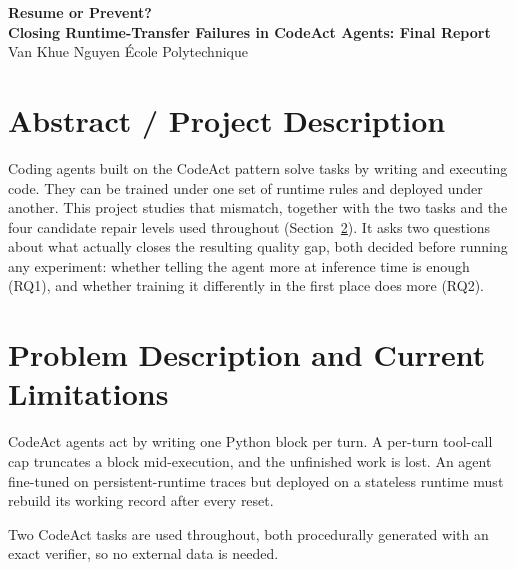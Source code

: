 \documentclass[11pt,a4paper]{article}
\begin{document}
\begin{center}
  {\LARGE\bfseries\color{accent} Resume or Prevent?}\\[3pt]
  {\large\bfseries Closing Runtime-Transfer Failures in CodeAct Agents: Final Report}\\[5pt]
  {\small Van Khue Nguyen \quad\textperiodcentered\quad École Polytechnique}
\end{center}

\section{Abstract / Project Description}
\label{sec:abstract}

Coding agents built on the CodeAct pattern solve tasks by writing and executing code. They can be
trained under one set of runtime rules and deployed under another. This project studies that
mismatch, together with the two tasks and the four candidate repair levels used throughout
(Section~\ref{sec:problem}). It asks two questions about what actually closes the resulting
quality gap, both decided before running any experiment: whether telling the agent more at
inference time is enough (RQ1), and whether training it differently in the first place does more
(RQ2).

\section{Problem Description and Current Limitations}
\label{sec:problem}

CodeAct agents act by writing one Python block per turn. A per-turn tool-call cap truncates a
block mid-execution, and the unfinished work is lost. An agent fine-tuned on persistent-runtime
traces but deployed on a stateless runtime must rebuild its working record after every reset.

Two CodeAct tasks are used throughout, both procedurally generated with an exact verifier, so no
external data is needed.
\end{document}

